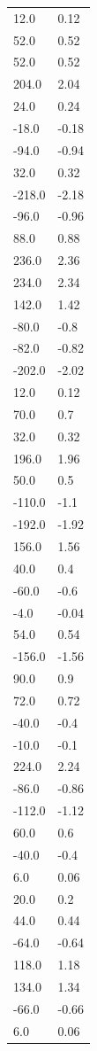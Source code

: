 \begin{longtable}{ll}
12.0 & 0.12 \\
52.0 & 0.52 \\
52.0 & 0.52 \\
204.0 & 2.04 \\
24.0 & 0.24 \\
-18.0 & -0.18 \\
-94.0 & -0.94 \\
32.0 & 0.32 \\
-218.0 & -2.18 \\
-96.0 & -0.96 \\
88.0 & 0.88 \\
236.0 & 2.36 \\
234.0 & 2.34 \\
142.0 & 1.42 \\
-80.0 & -0.8 \\
-82.0 & -0.82 \\
-202.0 & -2.02 \\
12.0 & 0.12 \\
70.0 & 0.7 \\
32.0 & 0.32 \\
196.0 & 1.96 \\
50.0 & 0.5 \\
-110.0 & -1.1 \\
-192.0 & -1.92 \\
156.0 & 1.56 \\
40.0 & 0.4 \\
-60.0 & -0.6 \\
-4.0 & -0.04 \\
54.0 & 0.54 \\
-156.0 & -1.56 \\
90.0 & 0.9 \\
72.0 & 0.72 \\
-40.0 & -0.4 \\
-10.0 & -0.1 \\
224.0 & 2.24 \\
-86.0 & -0.86 \\
-112.0 & -1.12 \\
60.0 & 0.6 \\
-40.0 & -0.4 \\
6.0 & 0.06 \\
20.0 & 0.2 \\
44.0 & 0.44 \\
-64.0 & -0.64 \\
118.0 & 1.18 \\
134.0 & 1.34 \\
-66.0 & -0.66 \\
6.0 & 0.06 \\

\end{longtable}
